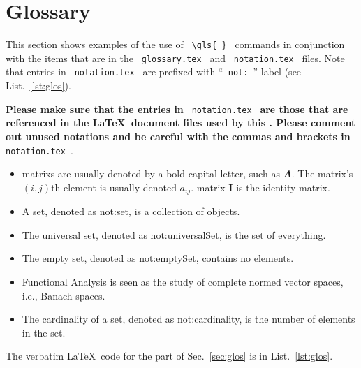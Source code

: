 \newpage
\section*{Glossary}
\label{sec:glos}

This section shows examples of the use of \verb| \gls{ } | commands in conjunction with the items that are in the \verb| glossary.tex | and \verb| notation.tex | files.  Note that entries in  \verb| notation.tex |  are prefixed with ``\verb| not: |'' label (see List.~\ref{lst:glos}).

\textbf{Please make sure that the entries in} \verb| notation.tex |\textbf{  are those that are referenced in the \LaTeX \ document files used by this \documentType.  Please comment out unused notations and be careful with the commas and brackets  in} \verb| notation.tex |.

\begin{itemize}

	\item \Glspl{matrix} are usually denoted by a bold capital letter, such as $\mathbfit{A}$. The \gls{matrix}'s $(i,j)$th element is usually denoted $a_{ij}$. \Gls{matrix} $\mathbf{I}$ is the identity \gls{matrix}.

	\item A set, denoted as \gls{not:set}, is a collection of objects.

	\item The universal set,  denoted as \gls{not:universalSet}, is the set of everything.

	\item The empty set, denoted as \gls{not:emptySet}, contains no elements.
	
	\item \Gls{Functional Analysis} is seen as the study of complete normed vector spaces, i.e., Banach spaces.
	
	\item The cardinality of a set, denoted as \gls{not:cardinality}, is the number of elements in the set.

\end{itemize}


The verbatim \LaTeX \ code for the part of Sec.~\ref{sec:glos} is in List.~\ref{lst:glos}.

